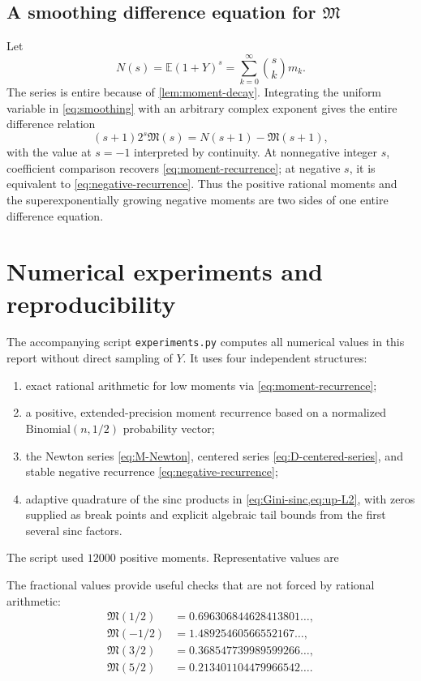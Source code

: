 \documentclass[11pt,oneside]{article}
\theoremstyle{definition}
\newcommand{\M}{\mathfrak M}
\newcommand{\E}{\mathbb E}
\begin{document}
\subsection{A smoothing difference equation for \texorpdfstring{\(\M\)}{M}}

Let
\begin{equation}\label{eq:Ndef}
 N(s)=\E(1+Y)^s
 =\sum_{k=0}^{\infty}\binom skm_k.
\end{equation}
The series is entire because of \cref{lem:moment-decay}.  Integrating the uniform
variable in \cref{eq:smoothing} with an arbitrary complex exponent gives the entire
difference relation
\begin{equation}\label{eq:M-difference}
 (s+1)2^s\M(s)=N(s+1)-\M(s+1),
\end{equation}
with the value at \(s=-1\) interpreted by continuity.  At nonnegative integer \(s\),
coefficient comparison recovers \cref{eq:moment-recurrence}; at negative \(s\), it is
equivalent to \cref{eq:negative-recurrence}.  Thus the positive rational moments and
the superexponentially growing negative moments are two sides of one entire
difference equation.

\section{Numerical experiments and reproducibility}\label{sec:numerics}

The accompanying script \texttt{experiments.py} computes all numerical values in this
report without direct sampling of \(Y\).  It uses four independent structures:
\begin{enumerate}
\item exact rational arithmetic for low moments via \cref{eq:moment-recurrence};
\item a positive, extended-precision moment recurrence based on a normalized
\(\mathrm{Binomial}(n,1/2)\) probability vector;
\item the Newton series \cref{eq:M-Newton}, centered series
\cref{eq:D-centered-series}, and stable negative recurrence
\cref{eq:negative-recurrence};
\item adaptive quadrature of the sinc products in \cref{eq:Gini-sinc,eq:up-L2}, with
zeros supplied as break points and explicit algebraic tail bounds from the first several
sinc factors.
\end{enumerate}

The script used \(12000\) positive moments.  Representative values are
\begin{center}

\end{center}
The fractional values provide useful checks that are not forced by rational arithmetic:
\begin{align}
 \M(1/2)&=0.696306844628413801\ldots,\nonumber\\
 \M(-1/2)&=1.48925460566552167\ldots,\nonumber\\
 \M(3/2)&=0.368547739989599266\ldots,\nonumber\\
 \M(5/2)&=0.213401104479966542\ldots.\label{eq:fractional-numerics}
\end{align}
\end{document}

